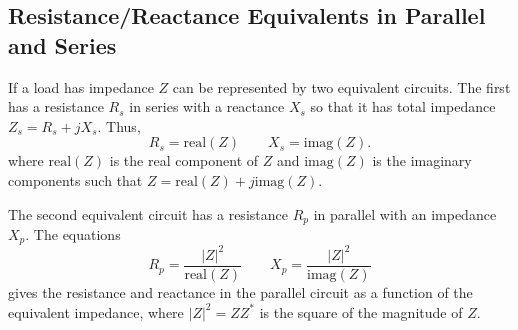 \documentclass{homework}
\begin{document}
\subsection{Resistance/Reactance Equivalents in Parallel and Series}
If a load has impedance $Z$ can be represented by two equivalent
circuits. The first has a resistance $R_s$ in series with a
reactance $X_s$ so that it has total impedance $Z_s = R_s + j X_s$.
Thus,
\begin{equation}
    R_s = \text{real}(Z) \qquad X_s = \text{imag}(Z).
\end{equation}
where $\text{real}(Z)$ is the real component of $Z$ and
$\text{imag}(Z)$ is the imaginary components such that
$Z = \text{real}(Z) + j \text{imag}(Z)$.

The second equivalent circuit has a resistance $R_p$ in parallel
with an impedance $X_p$. The equations
\begin{equation}
    R_p = \frac{|Z|^2}{\text{real}(Z)} \qquad
    X_p = \frac{|Z|^2}{\text{imag}(Z)}
    \label{eq:parallel-equivalent-impedance}
\end{equation}
gives the resistance and reactance in the parallel circuit
as a function of the equivalent impedance, where $|Z|^2 = ZZ^*$
is the square of the magnitude of $Z$.





\end{document}
